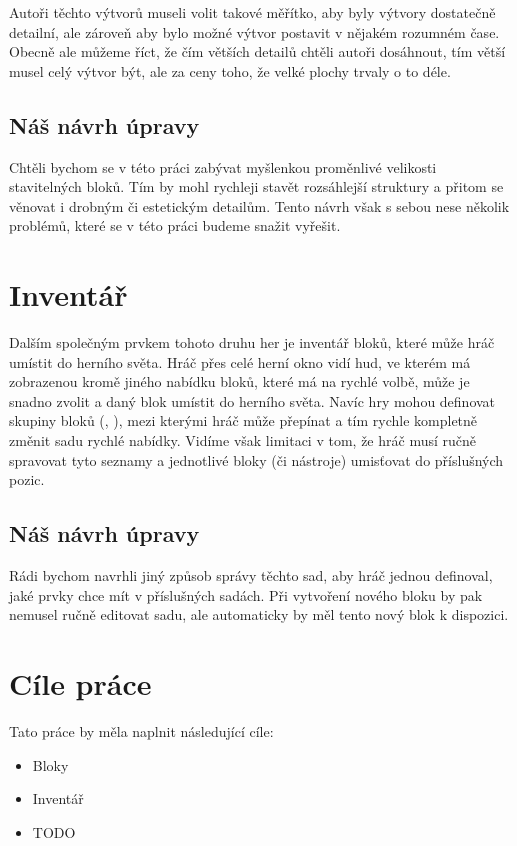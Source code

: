 Autoři těchto výtvorů museli volit takové měřítko, aby byly výtvory dostatečně detailní, ale zároveň aby bylo možné výtvor postavit v nějakém rozumném čase. Obecně ale můžeme říct, že čím větších detailů chtěli autoři dosáhnout, tím větší musel celý výtvor být, ale za ceny toho, že velké plochy trvaly o to déle.


\subsection{Náš návrh úpravy}
Chtěli bychom se v této práci zabývat myšlenkou proměnlivé velikosti stavitelných bloků. Tím by mohl rychleji stavět rozsáhlejší struktury a přitom se věnovat i drobným či estetickým detailům. Tento návrh však s sebou nese několik problémů, které se v této práci budeme snažit vyřešit.



\section{Inventář}
Dalším společným prvkem tohoto druhu her je inventář bloků, které může hráč umístit do herního světa. Hráč přes celé herní okno vidí \gls{hud}\citep{hud_terminology}, ve kterém má zobrazenou kromě jiného nabídku bloků, které má na rychlé volbě, může je snadno zvolit a daný blok umístit do herního světa. Navíc hry mohou definovat skupiny bloků (\SE{}, \ME{}), mezi kterými hráč může přepínat a tím rychle kompletně změnit sadu rychlé nabídky. Vidíme však limitaci v tom, že hráč musí ručně spravovat tyto seznamy a jednotlivé bloky (či nástroje) umisťovat do příslušných pozic.


\subsection{Náš návrh úpravy}
Rádi bychom navrhli jiný způsob správy těchto sad, aby hráč jednou definoval, jaké prvky chce mít v příslušných sadách. Při vytvoření nového bloku by pak nemusel ručně editovat sadu, ale automaticky by měl tento nový blok k dispozici.  




\section{Cíle práce}
Tato práce by měla naplnit následující cíle:
\begin{itemize}
	\item Bloky
	\item Inventář
	\item TODO
\end{itemize}


